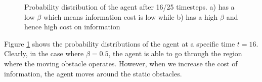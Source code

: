 \begin{figure}
	\caption{Probability distribution of the agent after 16/25 timesteps. a) has a low $\beta$ which means information cost is low while b) has a high $\beta$ and hence high cost on information}
	\label{fig:expres}
\end{figure}

Figure \ref{fig:expres} shows the probability distributions of the agent at a specific time $t=16$. Clearly, in the case where $\beta=0.5$, the agent is able to go through the region where the moving obstacle operates. However, when we increase the cost of information, the agent moves around the static obstacles.


